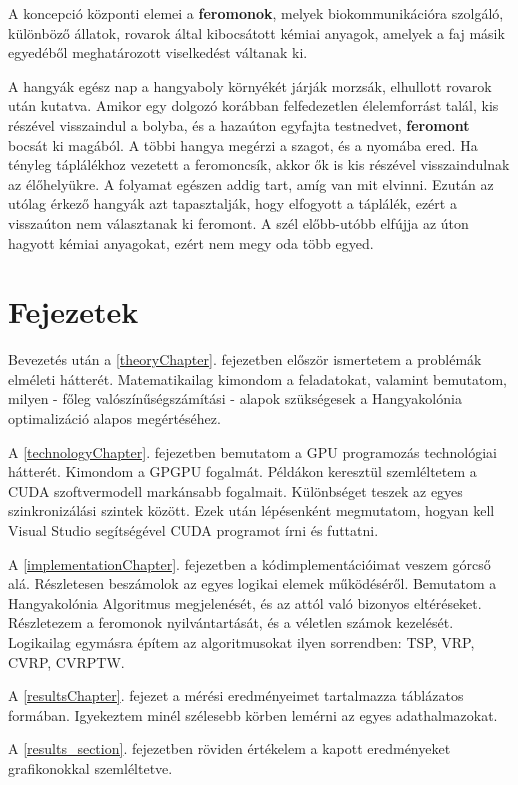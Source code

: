 A koncepció központi elemei a \textbf{feromonok}, melyek biokommunikációra szolgáló, különböző állatok, rovarok által kibocsátott kémiai anyagok, amelyek a faj másik egyedéből meghatározott viselkedést váltanak ki.

A hangyák egész nap a hangyaboly környékét járják morzsák, elhullott rovarok után kutatva. Amikor egy dolgozó korábban felfedezetlen élelemforrást talál, kis részével visszaindul a bolyba, és a hazaúton egyfajta testnedvet, \textbf{feromont} bocsát ki magából. A többi hangya megérzi a szagot, és a nyomába ered. Ha tényleg táplálékhoz vezetett a feromoncsík, akkor ők is kis részével visszaindulnak az élőhelyükre. A folyamat egészen addig tart, amíg van mit elvinni. Ezután az utólag érkező hangyák azt tapasztalják, hogy elfogyott a táplálék, ezért a visszaúton nem választanak ki feromont. A szél előbb-utóbb elfújja az úton hagyott kémiai anyagokat, ezért nem megy oda több egyed.

\section{Fejezetek}
Bevezetés után a \ref{theoryChapter}. fejezetben először ismertetem a problémák elméleti hátterét. Matematikailag kimondom a feladatokat, valamint bemutatom, milyen - főleg valószínűségszámítási - alapok szükségesek a Hangyakolónia optimalizáció alapos megértéséhez.

A \ref{technologyChapter}. fejezetben bemutatom a GPU programozás technológiai hátterét. Kimondom a GPGPU fogalmát. Példákon keresztül szemléltetem a CUDA szoftvermodell markánsabb fogalmait. Különbséget teszek az egyes szinkronizálási szintek között. Ezek után lépésenként megmutatom, hogyan kell Visual Studio segítségével CUDA programot írni és futtatni.

A \ref{implementationChapter}. fejezetben a kódimplementációimat veszem górcső alá. Részletesen beszámolok az egyes logikai elemek működéséről. Bemutatom a Hangyakolónia Algoritmus megjelenését, és az attól való bizonyos eltéréseket. Részletezem a feromonok nyilvántartását, és a véletlen számok kezelését. Logikailag egymásra építem az algoritmusokat ilyen sorrendben: TSP, VRP, CVRP, CVRPTW.

A \ref{resultsChapter}. fejezet a mérési eredményeimet tartalmazza táblázatos formában. Igyekeztem minél szélesebb körben lemérni az egyes adathalmazokat. 

A \ref{results_section}. fejezetben röviden értékelem a kapott eredményeket grafikonokkal szemléltetve. 

